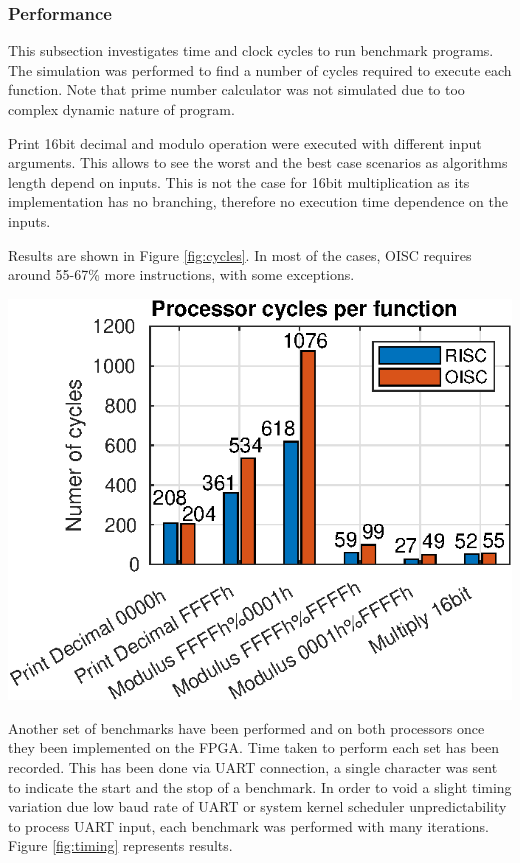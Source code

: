 \subsubsection{Performance}
This subsection investigates time and clock cycles to run benchmark programs. The simulation was performed to find a number of cycles required to execute each function. Note that prime number calculator was not simulated due to too complex dynamic nature of program. 

Print 16bit decimal and modulo operation were executed with different input arguments. This allows to see the worst and the best case scenarios as algorithms length depend on inputs. This is not the case for 16bit multiplication as its implementation has no branching, therefore no execution time dependence on the inputs.

Results are shown in Figure \ref{fig:cycles}. In most of the cases, OISC requires around 55-67\% more instructions, with some exceptions.

\begin{colfigure}
	\centering
	\includegraphics[width=\linewidth]{../tests/cycles.eps}
	\label{fig:cycles}
\end{colfigure}

Another set of benchmarks have been performed and on both processors once they been implemented on the FPGA. Time taken to perform each set has been recorded. This has been done via UART connection, a single character was sent to indicate the start and the stop of a benchmark. In order to void a slight timing variation due low baud rate of UART or system kernel scheduler unpredictability to process UART input, each benchmark was performed with many iterations. Figure \ref{fig:timing} represents results.

